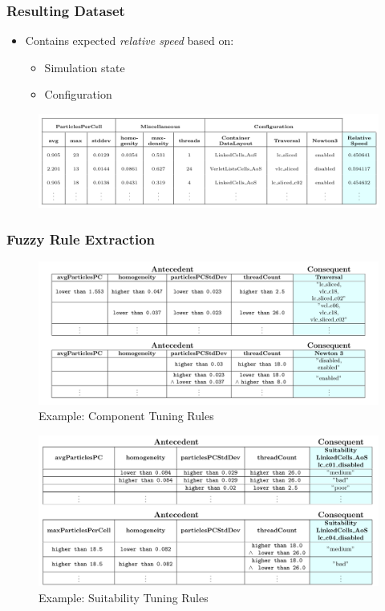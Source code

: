 \documentclass[
	10pt,
	t		%
]{beamer}
\begin{document}
\begin{frame}
	\frametitle{Resulting Dataset}
	
	\begin{itemize}
		\item Contains expected \textit{relative speed} based on:
		      \begin{itemize}
			      \item Simulation state
			      \item Configuration
		      \end{itemize}
	\end{itemize}
	
	\begin{figure}
		\centering
		\includegraphics[width=1\textwidth]{figures/relative-speed-table.png}
	\end{figure}
	
\end{frame}

\begin{frame}
	\frametitle{Fuzzy Rule Extraction}
	\vspace{-0.3cm}
	\begin{figure}
		\centering
		\includegraphics[width=1\textwidth, trim={1cm 8cm 0.5cm 0},clip]{figures/final-rules-component.png}
		\\		{\footnotesize Example: Component Tuning Rules}
	\end{figure}
	\begin{figure}
		\includegraphics[width=1\textwidth, trim={0 9cm 0 0.1cm},clip]{figures/final-rules-suitability.png}
		\\		{\footnotesize Example: Suitability Tuning Rules}
	\end{figure}
\end{frame}
\end{document}
